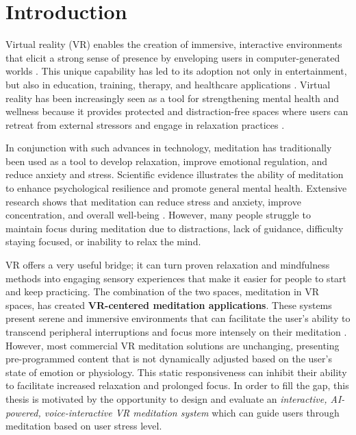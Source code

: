 \chapter{Introduction}
Virtual reality (VR) enables the creation of immersive, interactive environments that elicit a strong sense of presence by enveloping users in computer-generated worlds \cite{slater2018immersive,freeman2017virtual}. This unique capability has led to its adoption not only in entertainment, but also in education, training, therapy, and healthcare applications \cite{baker2019vrtherapy}. Virtual reality has been increasingly seen as a tool for strengthening mental health and wellness because it provides protected and distraction-free spaces where users can retreat from external stressors and engage in relaxation practices \cite{rehm2021virtual,bailenson2020experience}.

In conjunction with such advances in technology, meditation has traditionally been used as a tool to develop relaxation, improve emotional regulation, and reduce anxiety and stress\cite{sedlmeier2012meta,lutz2008attention,manocha2011mind}. Scientific evidence illustrates the ability of meditation to enhance psychological resilience and promote general mental health. Extensive research shows that meditation can reduce stress and anxiety, improve concentration, and overall well-being \cite{goyal2014meditation,zeidan2015mindfulness}. However, many people struggle to maintain focus during meditation due to distractions, lack of guidance, difficulty staying focused, or inability to relax the mind.

VR offers a very useful bridge; it can turn proven relaxation and mindfulness methods into engaging sensory experiences that make it easier for people to start and keep practicing. The combination of the two spaces, meditation in VR spaces, has created \textbf{VR-centered meditation applications}. These systems present serene and immersive environments that can facilitate the user's ability to transcend peripheral interruptions and focus more intensely on their meditation \cite{liszio2018nature,weibel2020biofeedback}. However, most commercial VR meditation solutions are unchanging, presenting pre-programmed content that is not dynamically adjusted based on the user's state of emotion or physiology. This static responsiveness can inhibit their ability to facilitate increased relaxation and prolonged focus. In order to fill the gap, this thesis is motivated by the opportunity to design and evaluate an \emph{interactive, AI-powered, voice-interactive VR meditation system} which can guide users through meditation based on user stress level. 


